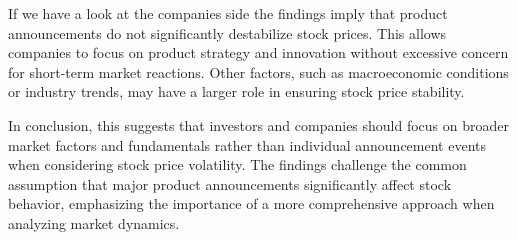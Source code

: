 \documentclass[12pt, oneside]{article}
\begin{document}
If we have a look at the companies side the findings imply that product announcements do not significantly destabilize stock prices. This allows companies to focus on product strategy and innovation without excessive concern for short-term market reactions. Other factors, such as macroeconomic conditions or industry trends, may have a larger role in ensuring stock price stability.

In conclusion, this suggests that investors and companies should focus on broader market factors and fundamentals rather than individual announcement events when considering stock price volatility. The findings challenge the common assumption that major product announcements significantly affect stock behavior, emphasizing the importance of a more comprehensive approach when analyzing market dynamics.

\newpage

\newpage
\nocite{*}

\newpage


\end{document}
